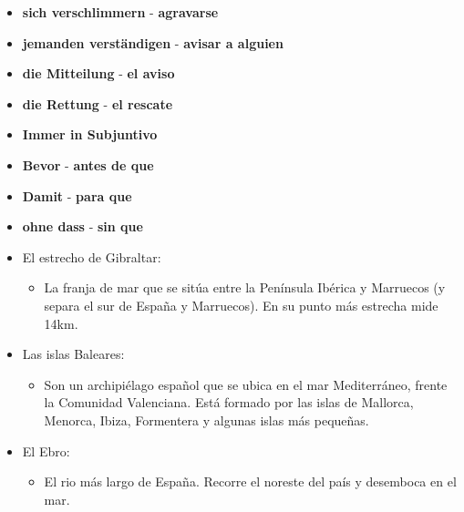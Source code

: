 \documentclass{article}
\begin{document}
\begin{multicols}{2}
\begin{itemize}
\begin{itemize}
			\item{\textbf{sich verschlimmern} - \textbf{agravarse}}
			\item{\textbf{jemanden verständigen} - \textbf{avisar a alguien}}
			\item{\textbf{die Mitteilung} - \textbf{el aviso}}
			\item{\textbf{die Rettung} - \textbf{el rescate}}
			\item{\textbf{Immer in Subjuntivo}}
			\item{\textbf{Bevor} - \textbf{antes de que}}
			\item{\textbf{Damit} - \textbf{para que}}
			\item{\textbf{ohne dass} - \textbf{sin que}}
		\end{itemize}
	\end{itemize}
	\end{multicols}
	\begin{itemize}
		\item{El estrecho de Gibraltar:}
		\begin{itemize}
			\item{La franja de mar que se sitúa entre la Península Ibérica y Marruecos (y separa el sur de España y Marruecos). En su punto más estrecha mide 14km.}
		\end{itemize}
		\item{Las islas Baleares:}
		\begin{itemize}
			\item{Son un archipiélago español que se ubica en el mar Mediterráneo, frente la Comunidad Valenciana. Está formado por las islas de Mallorca, Menorca, Ibiza, Formentera y algunas islas más pequeñas.}
		\end{itemize}
		\item{El Ebro:}
		\begin{itemize}
			\item{El rio más largo de España. Recorre el noreste del país y desemboca en el mar.}
		\end{itemize}
	\end{itemize}
\end{document}
